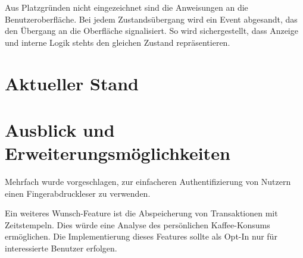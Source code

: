 \documentclass[11pt,a4paper]{IEEEtran} \usepackage[ngerman]{babel}
\begin{document}
Aus Platzgründen nicht eingezeichnet sind die Anweisungen an die
Benutzeroberfläche. Bei jedem Zustandsübergang wird ein Event abgesandt, das 
den Übergang an die Oberfläche signalisiert. So wird sichergestellt, dass
Anzeige und interne Logik stehts den gleichen Zustand repräsentieren.

\section{Aktueller Stand}

\section{Ausblick und Erweiterungsmöglichkeiten}

Mehrfach wurde vorgeschlagen, zur einfacheren Authentifizierung von Nutzern
einen Fingerabdruckleser zu verwenden. 

Ein weiteres Wunsch-Feature ist die Abspeicherung von Transaktionen mit
Zeitstempeln. Dies würde eine Analyse des persönlichen Kaffee-Konsums
ermöglichen. Die Implementierung dieses Features sollte als Opt-In nur für
interessierte Benutzer erfolgen. 

\printbibliography 
\end{document}
